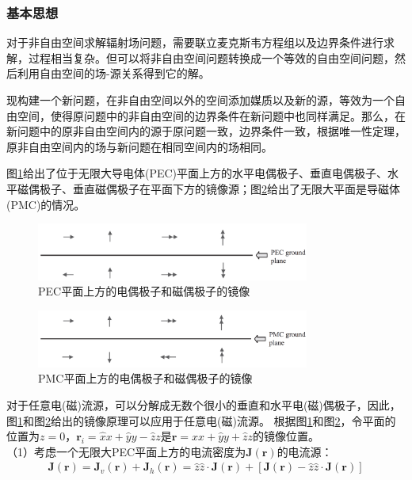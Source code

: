 \documentclass{article}
\numberwithin{equation}{section}
\renewcommand{\vec}[1]{\boldsymbol{#1}}
\begin{document}
\subsubsection{基本思想}
对于非自由空间求解辐射场问题，需要联立麦克斯韦方程组以及边界条件进行求解，过程相当复杂。但可以将非自由空间问题转换成一个等效的自由空间问题，然后利用自由空间的场-源关系得到它的解。
\par
现构建一个新问题，在非自由空间以外的空间添加媒质以及新的源，等效为一个自由空间，使得原问题中的非自由空间的边界条件在新问题中也同样满足。那么，在新问题中的原非自由空间内的源于原问题一致，边界条件一致，根据唯一性定理，原非自由空间内的场与新问题在相同空间内的场相同。
\par
图\ref{fig:fig7}给出了位于无限大导电体(PEC)平面上方的水平电偶极子、垂直电偶极子、水平磁偶极子、垂直磁偶极子在平面下方的镜像源；图\ref{fig:fig8}给出了无限大平面是导磁体(PMC)的情况。
\begin{figure}[ht]
    \centering
    \includegraphics[width=0.8\textwidth]{PEC平面上方的电偶极子和磁偶极子的镜像.PNG}
    \caption{PEC平面上方的电偶极子和磁偶极子的镜像}
    \label{fig:fig7}
\end{figure}
\begin{figure}[ht]
    \centering
    \includegraphics[width=0.8\textwidth]{PMC平面上方的电偶极子和磁偶极子的镜像.PNG}
    \caption{PMC平面上方的电偶极子和磁偶极子的镜像}
    \label{fig:fig8}
\end{figure}
\par
对于任意电(磁)流源，可以分解成无数个很小的垂直和水平电(磁)偶极子，因此，图\ref{fig:fig7}和图\ref{fig:fig8}给出的镜像原理可以应用于任意电(磁)流源。
根据图\ref{fig:fig7}和图\ref{fig:fig8}，令平面的位置为$z=0$，$\vec{r}_i=\hat{x}x+\hat{y}y-\hat{z}z$是$\vec{r}=\hat{x}x+\hat{y}y+\hat{z}z$的镜像位置。\\
（1）考虑一个无限大PEC平面上方的电流密度为$\mathbf{J}(\vec{r})$的电流源：
\begin{align}
    \label{eq:eq169}
    \mathbf{J}(\vec{r})=\mathbf{J}_v(\vec{r})+\mathbf{J}_h(\vec{r})=\hat{z}\hat{z}\cdot\mathbf{J}(\vec{r})+[\mathbf{J}(\vec{r})-\hat{z}\hat{z}\cdot\mathbf{J}(\vec{r})]
\end{align}
\end{document}
